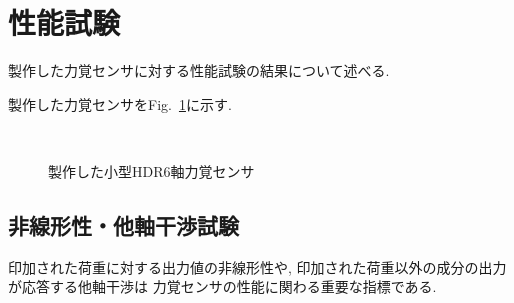 \section{性能試験}
製作した力覚センサに対する性能試験の結果について述べる. 

製作した力覚センサをFig.~\ref{fig:jissai}に示す.

\begin{figure}[h]
  \centering
  \\
  \caption[]{製作した小型HDR6軸力覚センサ}\label{fig:jissai}
\end{figure}

\subsection{非線形性・他軸干渉試験}
印加された荷重に対する出力値の非線形性や, 
印加された荷重以外の成分の出力が応答する他軸干渉は
力覚センサの性能に関わる重要な指標である. 
 


